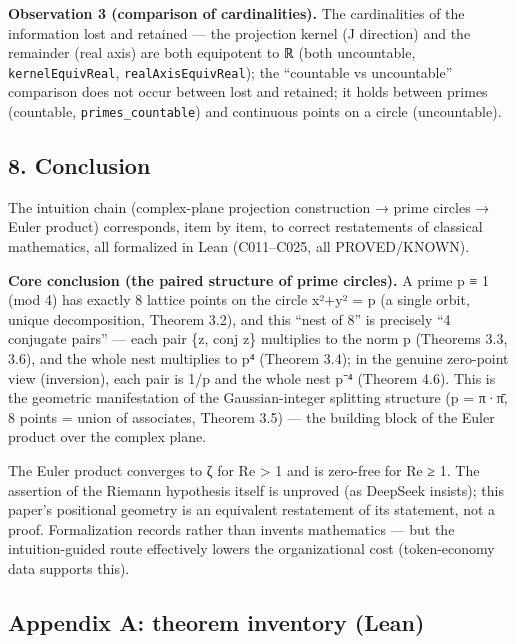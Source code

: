 \documentclass[
]{article}
\begin{document}
\textbf{Observation 3 (comparison of cardinalities).} The cardinalities
of the information lost and retained --- the projection kernel (J
direction) and the remainder (real axis) are both equipotent to ℝ (both
uncountable, \texttt{kernelEquivReal}, \texttt{realAxisEquivReal}); the
``countable vs uncountable'' comparison does not occur between lost and
retained; it holds between primes (countable,
\texttt{primes\_countable}) and continuous points on a circle
(uncountable).

\subsection{8. Conclusion}\label{conclusion}

The intuition chain (complex-plane projection construction → prime
circles → Euler product) corresponds, item by item, to correct
restatements of classical mathematics, all formalized in Lean
(C011--C025, all PROVED/KNOWN).

\textbf{Core conclusion (the paired structure of prime circles).} A
prime p ≡ 1 (mod 4) has exactly 8 lattice points on the circle x²+y² = p
(a single orbit, unique decomposition, Theorem 3.2), and this ``nest of
8'' is precisely ``4 conjugate pairs'' --- each pair \{z, conj z\}
multiplies to the norm p (Theorems 3.3, 3.6), and the whole nest
multiplies to p⁴ (Theorem 3.4); in the genuine zero-point view
(inversion), each pair is 1/p and the whole nest p⁻⁴ (Theorem 4.6). This
is the geometric manifestation of the Gaussian-integer splitting
structure (p = π·π̄, 8 points = union of associates, Theorem 3.5) --- the
building block of the Euler product over the complex plane.

The Euler product converges to ζ for Re \textgreater{} 1 and is
zero-free for Re ≥ 1. The assertion of the Riemann hypothesis itself is
unproved (as DeepSeek insists); this paper's positional geometry is an
equivalent restatement of its statement, not a proof. Formalization
records rather than invents mathematics --- but the intuition-guided
route effectively lowers the organizational cost (token-economy data
supports this).

\subsection{Appendix A: theorem inventory
(Lean)}\label{appendix-a-theorem-inventory-lean}
\end{document}
